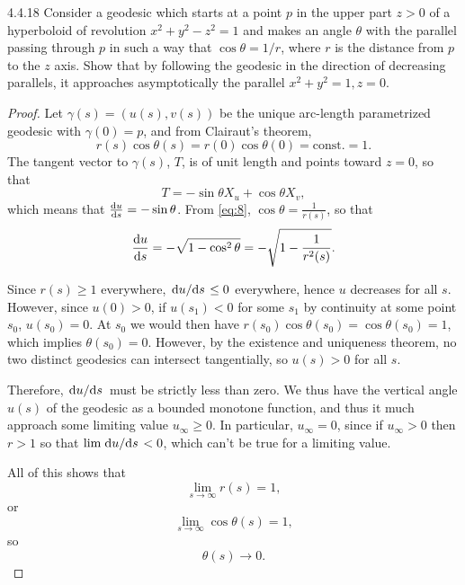 \documentclass[11pt]{article}
\begin{document}
\begin{problem}{4.4.18}
  Consider a geodesic which starts at a point \( p \) in the upper part \( z > 0 \) of a hyperboloid of revolution \( x^2 + y^2 - z^2 = 1 \) and makes an angle \(\theta\) with the parallel passing through \( p \) in such a way that \( \cos\theta = 1 /r \), where \( r \) is the distance from \( p \) to the \( z \) axis.
  Show that by following the geodesic in the direction of decreasing parallels, it approaches asymptotically the parallel \( x^2 + y^2 = 1, z = 0 \).
\end{problem}
\begin{proof}
  Let \(\gamma(s) = (u(s), v(s))\) be the unique arc-length parametrized geodesic with \(\gamma(0) = p\), and from Clairaut's theorem,
  \begin{equation}
  \label{eq:8}
  r(s)\cos\theta(s) = r(0)\cos\theta(0) = \text{const.} = 1.
\end{equation}
The tangent vector to \(\gamma(s)\), \( T \), is of unit length and points toward \( z=0 \), so that
\begin{equation}
\label{eq:12}
T = -\sin\theta X_u + \cos\theta X_{v},
\end{equation}
which means that \( \dv{u}{s} = -\sin\theta \).
From \cref{eq:8}, \( \cos\theta = \frac{1}{r(s)} \), so that
\begin{equation}
\label{eq:13}
\dv{u}{s} = - \sqrt{1 - \cos^2\theta} = -\sqrt{1 - \frac{1}{r^2(s)}}.
\end{equation}

Since \( r(s) \geq 1 \) everywhere, \( \dv*{u}{s} \leq 0 \) everywhere, hence \( u \) decreases for all \( s \).
However, since \( u(0) > 0 \), if \( u(s_1) < 0 \) for some \( s_1 \) by continuity at some point \( s_0 \), \( u(s_{0}) = 0 \).
At \( s_0 \) we would then have \( r(s_0)\cos\theta(s_0) = \cos\theta(s_0) = 1 \), which implies \(\theta(s_0) = 0\).
However, by the existence and uniqueness theorem, no two distinct geodesics can intersect tangentially, so \( u(s) > 0 \) for all \( s \).

Therefore, \( \dv*{u}{s} \) must be strictly less than zero.
We thus have the vertical angle \( u(s) \) of the geodesic as a bounded monotone function, and thus it much approach some limiting value \( u_{\infty} \geq 0\).
In particular, \( u_{\infty} = 0 \), since if \( u_{\infty} > 0 \) then \( r > 1 \) so that \( \lim \dv*{u}{s} < 0 \), which can't be true for a limiting value.

All of this shows that
\begin{equation}
\label{eq:15}
\lim_{s\rightarrow\infty} r(s) = 1,
\end{equation}
or
\begin{equation}
\label{eq:16}
\lim_{s\rightarrow \infty} \cos\theta(s) = 1,
\end{equation}
so
\begin{equation}
\label{eq:17}
\theta(s) \rightarrow 0.
\end{equation}
\end{proof}
\end{document}
